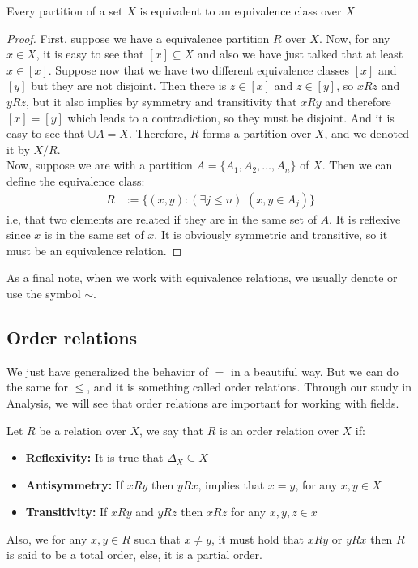 \documentclass{tufte-handout}
\begin{document}
\begin{theorem}
	Every partition of a set $X$ is equivalent to an equivalence class over $X$
\end{theorem}
\begin{proof}
	First, suppose we have a equivalence partition $R$ over $X$. Now, for any $x \in X$, it is easy to see that $[x] \subseteq X$ and also we have just talked that at least $x \in [x]$. Suppose now that we have two different equivalence classes $[x]$ and $[y]$ but they are not disjoint. Then there is $z \in [x]$ and $z \in [y]$, so $xRz$ and $yRz$, but it also implies by symmetry and transitivity that $xRy$ and therefore $[x] = [y]$ which leads to a contradiction, so they must be disjoint. And it is easy to see that $\cup A = X$. Therefore, $R$ forms a partition over $X$, and we denoted it by $X / R$.\\

	Now, suppose we are with a partition $A = \{A_1, A_2, \dots, A_n\}$ of $X$. Then we can define the equivalence class:
	\begin{align*}
		R &:= \{(x, y): (\exists j \le n) \,\, (x, y \in A_j)\}
	\end{align*}
	i.e, that two elements are related if they are in the same set of $A$. It is reflexive since $x$ is in the same set of $x$. It is obviously symmetric and transitive, so it must be an equivalence relation.
\end{proof}

As a final note, when we work with equivalence relations, we usually denote or use the symbol $\sim$.

\subsection{Order relations}
We just have generalized the behavior of $=$ in a beautiful way. But we can do the same for $\le$, and it is something called order relations. Through our study in Analysis, we will see that order relations are important for working with fields.

\begin{definition}
	Let $R$ be a relation over $X$, we say that $R$ is an order relation over $X$ if:
	\begin{itemize}
		\item \textbf{Reflexivity:} It is true that $\Delta_X \subseteq X$
		\item \textbf{Antisymmetry:} If $xRy$ then $yRx$, implies that $x = y$, for any $x, y \in X$
		\item \textbf{Transitivity:} If $xRy$ and $yRz$ then $xRz$ for any $x, y, z \in x$
	\end{itemize}
	Also, we for any $x, y \in R$ such that $x \neq y$, it must hold that $xRy$ or $yRx$ then $R$ is said to be a total order, else, it is a partial order.
\end{definition}
\end{document}
